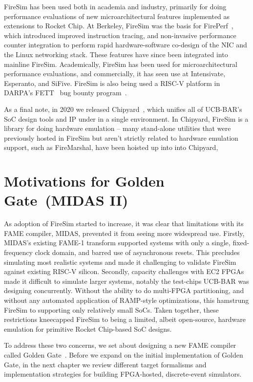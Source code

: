 FireSim has been used both in academia and industry, primarily for doing
performance evaluations of new microarchitectural features implemented as
extensions to Rocket Chip.  At Berkeley, FireSim was the basis for
FirePerf~\cite{FirePerf}, which introduced improved instruction tracing, and
non-invasive performance counter integration to perform rapid hardware-software co-design of the NIC
and the Linux networking stack. These features have since been integrated into
mainline FireSim. Academically, FireSim has been used for microarchitectural performance evaluations,
and commercially, it has seen use at Intensivate, Esperanto, and SiFive. FireSim is also being used a RISC-V platform in DARPA's
FETT~\cite{FETT} bug bounty program~\cite{FireSimFETT}.

As a final note, in 2020 we released Chipyard~\cite{Chipyard}, which unifies all of
UCB-BAR's SoC design tools and IP under in a single environment. In Chipyard,
FireSim is a library for doing hardware emulation -- many stand-alone utilities
that were previously hosted in FireSim but aren't strictly related to hardware emulation
support, such as FireMarshal, have been hoisted up into into Chipyard,

\section{Motivations for Golden Gate~(MIDAS II)}

As adoption of FireSim started to increase, it was clear that limitations with
its FAME compiler, MIDAS, prevented it from seeing more widespread use. Firstly, MIDAS's existing FAME-1
transform supported systems with only a single, fixed-frequency clock domain,
and barred use of asynchronous resets. This precludes
simulating most realistic systems and made it challenging to validate FireSim
against existing RISC-V silicon. Secondly, capacity challenges with EC2
FPGAs made it difficult to simulate larger systems, notably the test-chips
UCB-BAR was designing concurrently. Without the ability to do multi-FPGA
partitioning, and without any automated application of RAMP-style
optimizations, this hamstrung FireSim to supporting only relatively small
SoCs. Taken together, these restrictions kneecapped FireSim to being a limited, albeit
open-source, hardware emulation for primitive Rocket Chip-based SoC designs.

To address these two concerns, we set about designing a new FAME compiler
called Golden Gate~\cite{GoldenGate}. Before we expand on the initial
implementation of Golden Gate, in the next chapter we review different target formalisms and
implementation strategies for building FPGA-hosted, discrete-event simulators.
